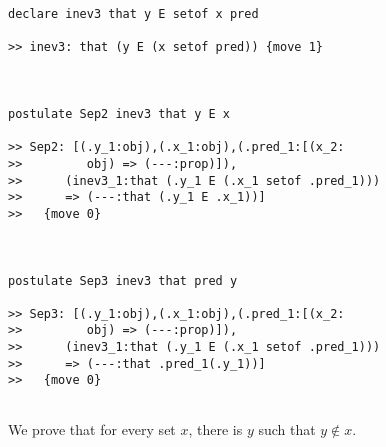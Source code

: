 \documentclass{article}
\begin{document}
\begin{verbatim}
declare inev3 that y E setof x pred

>> inev3: that (y E (x setof pred)) {move 1}



postulate Sep2 inev3 that y E x

>> Sep2: [(.y_1:obj),(.x_1:obj),(.pred_1:[(x_2:
>>         obj) => (---:prop)]),
>>      (inev3_1:that (.y_1 E (.x_1 setof .pred_1)))
>>      => (---:that (.y_1 E .x_1))]
>>   {move 0}



postulate Sep3 inev3 that pred y

>> Sep3: [(.y_1:obj),(.x_1:obj),(.pred_1:[(x_2:
>>         obj) => (---:prop)]),
>>      (inev3_1:that (.y_1 E (.x_1 setof .pred_1)))
>>      => (---:that .pred_1(.y_1))]
>>   {move 0}


\end{verbatim}

We prove that for every set $x$, there is $y$ such that $y \not\in x$.
\end{document}
